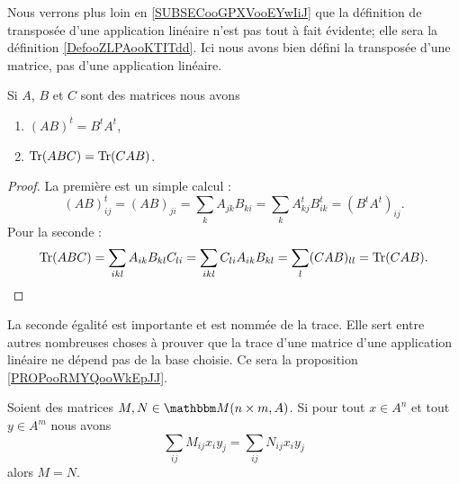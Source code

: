     Nous verrons plus loin en \ref{SUBSECooGPXVooEYwIiJ} que la définition de transposée d'une application linéaire n'est pas tout à fait évidente; elle sera la définition \ref{DefooZLPAooKTITdd}. Ici nous avons bien défini la transposée d'une matrice, pas d'une application linéaire.


\begin{lemma}        \label{LEMooUXDRooWZbMVN} \label{LEMooRSJTooQEoOtN}
    Si \( A\), \( B\) et \( C\) sont des matrices nous avons
    \begin{enumerate}
        \item
            \( (AB)^t=B^tA^t\),
        \item       \label{ITEMooXDYQooAlnArd}
            \( \operatorname{Tr}(ABC)=\operatorname{Tr}(CAB)\).
    \end{enumerate}
\end{lemma}

\begin{proof}
    La première est un simple calcul :
    \begin{equation}
        (AB)^t_{ij}=(AB)_{ji}=\sum_kA_{jk}B_{ki}=\sum_kA^t_{kj}B^t_{ik}=(B^tA^t)_{ij}.
    \end{equation}
    Pour la seconde :
    \begin{equation}
        \operatorname{Tr}(ABC)=\sum_{ikl}A_{ik}B_{kl}C_{li}=\sum_{ikl}C_{li}A_{ik}B_{kl}=\sum_l(CAB)_{ll}=\operatorname{Tr}(CAB).
    \end{equation}
\end{proof}

\begin{normaltext}
    La seconde égalité est importante et est nommée  de la trace. Elle sert entre autres nombreuses choses à prouver que la trace d'une matrice d'une application linéaire ne dépend pas de la base choisie. Ce sera la proposition \ref{PROPooRMYQooWkEpJJ}.
\end{normaltext}

\begin{lemma}       \label{LEMooLXAHooPRyHaF}
    Soient des matrices \( M, N\in \eM(n \times m,A)\). Si pour tout \( x \in A^n\) et tout \( y \in A^m\) nous avons
    \begin{equation}
        \sum_{ij}M_{ij}x_iy_j=\sum_{ij}N_{ij}x_iy_j
    \end{equation}
    alors \( M=N\).
\end{lemma}

